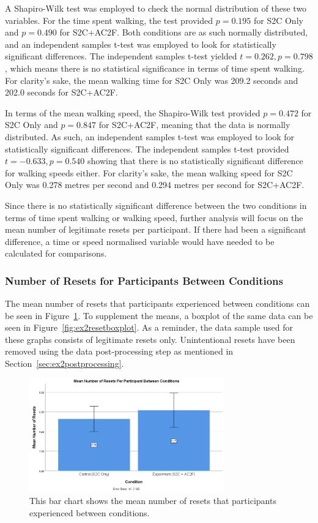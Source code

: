 A Shapiro-Wilk test was employed to check the normal distribution of these two variables. For the time spent walking, the test provided $p = 0.195$ for S2C Only and $p = 0.490$ for S2C+AC2F. Both conditions are as such normally distributed, and an independent samples t-test was employed to look for statistically significant differences. The independent samples t-test yielded $t = 0.262, p = 0.798$, which means there is no statistical significance in terms of time spent walking. For clarity's sake, the mean walking time for S2C Only was 209.2 seconds and 202.0 seconds for S2C+AC2F. 

In terms of the mean walking speed, the Shapiro-Wilk test provided $p = 0.472$ for S2C Only and $p = 0.847$ for S2C+AC2F, meaning that the data is normally distributed. As such, an independent samples t-test was employed to look for statistically significant differences. The independent samples t-test provided $t = -0.633, p = 0.540$ showing that there is no statistically significant difference for walking speeds either. For clarity's sake, the mean walking speed for S2C Only was 0.278 metres per second and 0.294 metres per second for S2C+AC2F.

Since there is no statistically significant difference between the two conditions in terms of time spent walking or walking speed, further analysis will focus on the mean number of legitimate resets per participant. If there had been a significant difference, a time or speed normalised variable would have needed to be calculated for comparisons. 

\subsubsection{Number of Resets for Participants Between Conditions}
The mean number of resets that participants experienced between conditions can be seen in Figure~\ref{fig:ex2resetMeans}. To supplement the means, a boxplot of the same data can be seen in Figure~\ref{fig:ex2resetboxplot}. As a reminder, the data sample used for these graphs consists of legitimate resets only. Unintentional resets have been removed using the data post-processing step as mentioned in Section~\ref{sec:ex2postprocessing}.

\begin{figure}[tbph]
    \centering
    \includegraphics[width=0.75\textwidth]{figures/graphs/ResetMeans.png}
    \caption[Mean Number of Resets Between Conditions for Experiment 2]{This bar chart shows the mean number of resets that participants experienced between conditions.}
    \label{fig:ex2resetMeans}
\end{figure}

